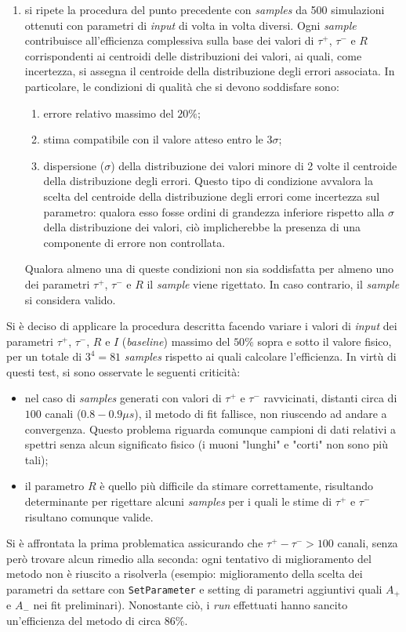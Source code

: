 \documentclass[10pt, oneside, a4paper]{article}   	%
\begin{document}
\begin{enumerate}
 \item si ripete la procedura del punto precedente con \textit{samples} da 500 simulazioni ottenuti con parametri di \textit{input} di volta in volta diversi. Ogni \textit{sample} contribuisce all'efficienza complessiva sulla base dei valori di $\tau^+$, $\tau^-$ e $R$ corrispondenti ai centroidi delle distribuzioni dei valori, ai quali, come incertezza, si assegna il centroide della distribuzione degli errori associata. In particolare, le condizioni di qualità che si devono soddisfare sono:  
 \begin{enumerate}
  \item errore relativo massimo del $20\%$;
  \item stima compatibile con il valore atteso entro le $3\sigma$;
  \item dispersione ($\sigma$) della distribuzione dei valori minore di 2 volte il centroide della distribuzione degli errori. Questo tipo di condizione avvalora la scelta del centroide della distribuzione degli errori come incertezza sul parametro: qualora esso fosse ordini di grandezza inferiore rispetto alla $\sigma$ della distribuzione dei valori, ciò implicherebbe la presenza di una componente di errore non controllata.  
 \end{enumerate}
Qualora almeno una di queste condizioni non sia soddisfatta per almeno uno dei parametri $\tau^+$, $\tau^-$ e $R$ il \textit{sample} viene rigettato. In caso contrario, il \textit{sample} si considera valido. 
\end{enumerate}
Si è deciso di applicare la procedura descritta facendo variare i valori di \textit{input} dei parametri $\tau^+$, $\tau^-$, $R$ e $I$ (\textit{baseline}) massimo del $50\%$ sopra e sotto il valore fisico, per un totale di $3^4=81$ \textit{samples} rispetto ai quali calcolare l'efficienza. In virtù di questi test, si sono osservate le seguenti criticità:
\begin{itemize}
 \item nel caso di \textit{samples} generati con valori di $\tau^+$ e $\tau^-$ ravvicinati, distanti circa di $100$ canali ($0.8 - 0.9 \mu s$), il metodo di fit fallisce, non riuscendo ad andare a convergenza. Questo problema riguarda comunque campioni di dati relativi a spettri senza alcun significato fisico (i muoni "lunghi" e "corti" non sono più tali);
 \item il parametro $R$ è quello più difficile da stimare correttamente, risultando determinante per rigettare alcuni \textit{samples} per i quali le stime di $\tau^+$ e $\tau^-$ risultano comunque valide.  
\end{itemize}
Si è affrontata la prima problematica assicurando che $\tau^+-\tau^->100$ canali, senza però trovare alcun rimedio alla seconda: ogni tentativo di miglioramento del metodo non è riuscito a risolverla (esempio: miglioramento della scelta dei parametri da settare con \lstinline{SetParameter} e setting di parametri aggiuntivi quali $A_+$ e $A_-$ nei fit preliminari).
Nonostante ciò, i \textit{run} effettuati hanno sancito un'efficienza del metodo di circa $86\%$. 






\appendix


\end{document}
